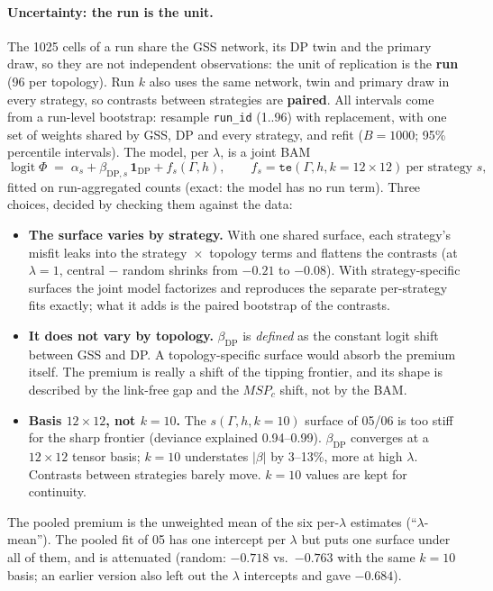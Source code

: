 \documentclass[11pt,a4paper]{article}
\newcommand{\code}[1]{\texttt{#1}}
\begin{document}
\paragraph{Uncertainty: the run is the unit.} The 1025 cells of a run share the GSS
network, its DP twin and the primary draw, so they are not independent observations:
the unit of replication is the \textbf{run} (96 per topology). Run $k$ also uses the same
network, twin and primary draw in every strategy, so contrasts between strategies are
\textbf{paired}. All intervals come from a run-level bootstrap: resample \code{run\_id}
(1..96) with replacement, with one set of weights shared by GSS, DP and every strategy,
and refit ($B = 1000$; 95\% percentile intervals). The model, per $\lambda$, is a joint BAM
\begin{equation*}
  \operatorname{logit} \Phi \;=\; \alpha_s + \beta_{\text{DP},s}\,\mathbf{1}_{\text{DP}}
  + f_s(\Gamma, h), \qquad f_s = \code{te}(\Gamma, h, k = 12 \times 12)\ \text{per strategy } s,
\end{equation*}
fitted on run-aggregated counts (exact: the model has no run term). Three choices,
decided by checking them against the data:
\begin{itemize}
  \item \textbf{The surface varies by strategy.} With one shared surface, each strategy's
    misfit leaks into the strategy~$\times$~topology terms and flattens the contrasts (at
    $\lambda = 1$, central $-$ random shrinks from $-0.21$ to $-0.08$). With
    strategy-specific surfaces the joint model factorizes and reproduces the separate
    per-strategy fits exactly; what it adds is the paired bootstrap of the contrasts.
  \item \textbf{It does not vary by topology.} $\beta_{\text{DP}}$ is \emph{defined} as
    the constant logit shift between GSS and DP. A topology-specific surface would absorb
    the premium itself. The premium is really a shift of the tipping frontier, and its
    shape is described by the link-free gap and the $MSP_c$ shift, not by the BAM.
  \item \textbf{Basis $12 \times 12$, not $k = 10$.} The $s(\Gamma, h, k = 10)$ surface of
    05/06 is too stiff for the sharp frontier (deviance explained 0.94--0.99). $\beta_{\text{DP}}$
    converges at a $12 \times 12$ tensor basis; $k = 10$ understates $|\beta|$ by
    3--13\%, more at high $\lambda$. Contrasts between strategies barely move. $k = 10$
    values are kept for continuity.
\end{itemize}
The pooled premium is the unweighted mean of the six per-$\lambda$ estimates
(``$\lambda$-mean''). The pooled fit of 05 has one intercept per $\lambda$ but puts one
surface under all of them, and is attenuated (random: $-0.718$ vs.\ $-0.763$ with the same
$k = 10$ basis; an earlier version also left out the $\lambda$ intercepts and gave $-0.684$).
\end{document}
